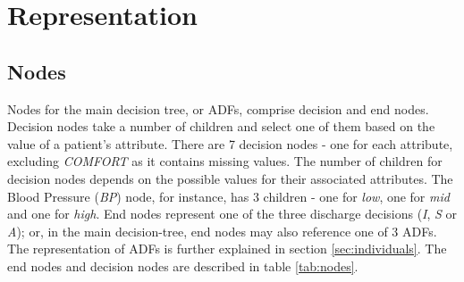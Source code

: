 \section{Representation}

\subsection{Nodes}
Nodes for the main decision tree, or ADFs, comprise decision and end nodes. Decision nodes take a number of children and select one of them based on the value of a patient's attribute. There are 7 decision nodes - one for each attribute, excluding \emph{COMFORT} as it contains missing values. The number of children for decision nodes depends on the possible values for their associated attributes. The Blood Pressure (\emph{BP}) node, for instance, has 3 children - one for \emph{low}, one for \emph{mid} and one for \emph{high}. End nodes represent one of the three discharge decisions (\emph{I}, \emph{S} or \emph{A}); or, in the main decision-tree, end nodes may also reference one of 3 ADFs. The representation of ADFs is further explained in section \ref{sec:individuals}. The end nodes and decision nodes are described in table \ref{tab:nodes}.

